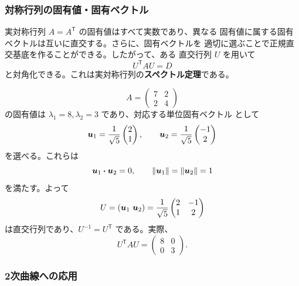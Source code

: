 \subsubsection{対称行列の固有値・固有ベクトル}

実対称行列 $A=A^{\mathsf T}$ の固有値はすべて実数であり、異なる
固有値に属する固有ベクトルは互いに直交する。さらに、固有ベクトルを
適切に選ぶことで正規直交基底を作ることができる。したがって、ある
直交行列 $U$ を用いて
\begin{equation}
 \boxed{U^{\mathsf T}AU=D}
\end{equation}
と対角化できる。これは実対称行列の\textbf{スペクトル定理}である。

\begin{example}[対称行列の直交対角化]
\[
 A=\begin{pmatrix}7&2\\2&4\end{pmatrix}
\]
の固有値は $\lambda_1=8,\lambda_2=3$ であり、対応する単位固有ベクトル
として
\[
 \bm{u}_1=\frac1{\sqrt5}\begin{pmatrix}2\\1\end{pmatrix},
 \qquad
 \bm{u}_2=\frac1{\sqrt5}\begin{pmatrix}-1\\2\end{pmatrix}
\]
を選べる。これらは
\[
 \bm{u}_1\mathbin{\boldsymbol{\cdot}}\bm{u}_2=0,\qquad
 \lVert\bm{u}_1\rVert=\lVert\bm{u}_2\rVert=1
\]
を満たす。よって
\[
 U=(\bm{u}_1\ \bm{u}_2)
 =\frac1{\sqrt5}\begin{pmatrix}2&-1\\1&2\end{pmatrix}
\]
は直交行列であり、$U^{-1}=U^{\mathsf T}$ である。実際、
\[
 U^{\mathsf T}AU=\begin{pmatrix}8&0\\0&3\end{pmatrix}.
\]
\end{example}

\subsubsection{2次曲線への応用}

